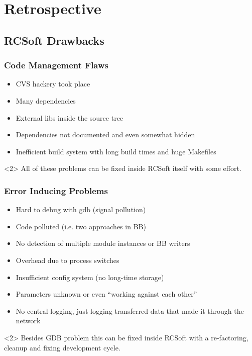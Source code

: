 %
%
%

\section{Retrospective}


\subsection{RCSoft Drawbacks}
\begin{frame}
  \frametitle{Code Management Flaws}
  \begin{itemize}
  \item CVS hackery took place
  \item Many dependencies
  \item External libs inside the source tree
  \item Dependencies not documented and even somewhat hidden
  \item Inefficient build system with long build times and huge Makefiles
  \end{itemize}
  \begin{block}<2>{}
    All of these problems can be fixed inside RCSoft itself
    with some effort.
  \end{block}
\end{frame}


\begin{frame}
  \frametitle{Error Inducing Problems}
  \begin{itemize}
  \item Hard to debug with gdb (signal pollution)
  \item Code polluted (i.e. two approaches in BB)
  \item No detection of multiple module instances or BB writers
  \item Overhead due to process switches
  \item Insufficient config system (no long-time storage)
  \item Parameters unknown or even ``working against each other''
  \item No central logging, just logging transferred data that made it
    through the network
  \end{itemize}
  \begin{block}<2>{}
    Besides GDB problem this can be fixed inside RCSoft with
    a re-factoring, cleanup and fixing development cycle.
  \end{block}
\end{frame}

